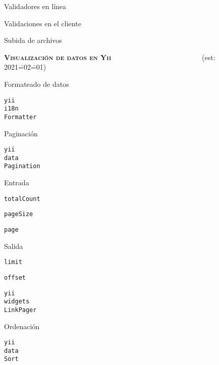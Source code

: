 \begin{longenum}
\begin{longenum}
\begin{longenum}
            \item Validadores en línea
            \item Validaciones en el cliente \opcional\
        \end{longenum}
        \item Subida de archivos
    \end{longenum}
    \item \textbf{\textsc{Visualización de datos en Yii}} \ \ \ \ \ \ \ \ \ \ \ \ \ \ \ \ \ \ \ \ \ \ \ \ \ (est: 2021\==02\==01)
    \begin{longenum}
        \item Formateado de datos
        \begin{longenum}
            \item \texttt{yii\\i18n\\Formatter}
        \end{longenum}
        \item Paginación
        \begin{longenum}
            \item \texttt{yii\\data\\Pagination}
            \item Entrada
            \begin{longenum}
                \item \texttt{totalCount}
                \item \texttt{pageSize}
                \item \texttt{page}
            \end{longenum}
            \item Salida
            \begin{longenum}
                \item \texttt{limit}
                \item \texttt{offset}
            \end{longenum}
            \item \texttt{yii\\widgets\\LinkPager}
        \end{longenum}
        \item Ordenación
        \begin{longenum}
            \item \texttt{yii\\data\\Sort}

\end{longenum}
\end{longenum}
\end{longenum}
